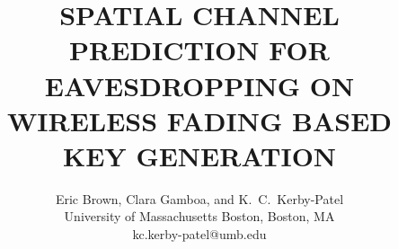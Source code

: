 \documentclass{allertonproc}
\title{SPATIAL CHANNEL PREDICTION FOR EAVESDROPPING ON WIRELESS FADING BASED KEY GENERATION}
\date{}
\author{Eric Brown, Clara Gamboa, and K.~C.~Kerby-Patel\\University of Massachusetts Boston, Boston, MA\\kc.kerby-patel@umb.edu}
\begin{document}
\maketitle
\abstract{
}
\end{document}
